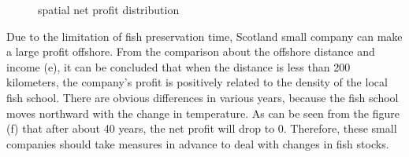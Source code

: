 \documentclass{mcmthesis}
\begin{document}
\begin{figure}[htbp]
  \quad
  \centering
  \caption{spatial net profit distribution}
\end{figure}

Due to the limitation of fish preservation time,  Scotland small company can make a large profit offshore. From the comparison about the offshore distance and income (e), it can be concluded that when the distance is less than 200 kilometers, the company's profit is positively related to the density of the local fish school. There are obvious differences in various years, because the fish school moves northward with the change in temperature. As can be seen from the figure (f) that after about 40 years, the net profit will drop to 0. Therefore, these small companies should take measures in advance to deal with changes in fish stocks.
\end{document}
